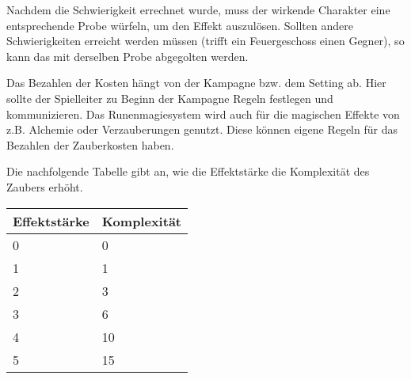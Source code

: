 \documentclass{article}
\begin{document}
Nachdem die Schwierigkeit errechnet wurde, muss der wirkende Charakter eine entsprechende Probe würfeln, um den Effekt
auszulösen. Sollten andere Schwierigkeiten erreicht werden müssen (trifft ein Feuergeschoss einen Gegner), so kann das
mit derselben Probe abgegolten werden.

Das Bezahlen der Kosten hängt von der Kampagne bzw. dem Setting ab. Hier sollte der Spielleiter zu Beginn der Kampagne
Regeln festlegen und kommunizieren. Das Runenmagiesystem wird auch für die magischen Effekte von z.B. Alchemie oder
Verzauberungen genutzt. Diese können eigene Regeln für das Bezahlen der Zauberkosten haben.

Die nachfolgende Tabelle gibt an, wie die Effektstärke die Komplexität des Zaubers erhöht.


\begin{small}
\begin{tabular}{|m{3cm}|m{3cm}|}
\hline
\textbf{Effektstärke}&\textbf{Komplexität}\\
\hline
\hline
0&0\\
\hline
1&1\\
\hline
2&3\\
\hline
3&6\\
\hline
4&10\\
\hline
5&15\\
\hline
\end{tabular}
\end{small}
\end{document}
